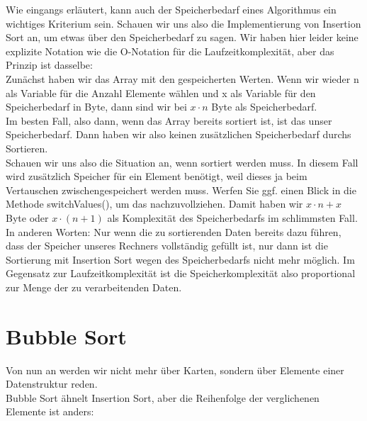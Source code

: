 Wie eingangs erläutert, kann auch der Speicherbedarf eines Algorithmus ein wichtiges Kriterium sein. Schauen wir uns also die Implementierung von Insertion Sort an, um etwas über den Speicherbedarf zu sagen. Wir haben hier leider keine explizite Notation wie die O-Notation für die Laufzeitkomplexität, aber das Prinzip ist dasselbe:\\

Zunächst haben wir das Array mit den gespeicherten Werten. Wenn wir wieder n als Variable für die Anzahl Elemente wählen und x als Variable für den Speicherbedarf in Byte, dann sind wir bei \(x \cdot n\) Byte als Speicherbedarf.\\

Im besten Fall, also dann, wenn das Array bereits sortiert ist, ist das unser Speicherbedarf. Dann haben wir also keinen zusätzlichen Speicherbedarf durchs Sortieren.\\

Schauen wir uns also die Situation an, wenn sortiert werden muss. In diesem Fall wird zusätzlich Speicher für ein Element benötigt, weil dieses ja beim Vertauschen zwischengespeichert werden muss. Werfen Sie ggf. einen Blick in die Methode switchValues(), um das nachzuvollziehen. Damit haben wir \(x \cdot n + x\) Byte oder \(x \cdot (n + 1)\) als Komplexität des Speicherbedarfs im schlimmsten Fall.\\

In anderen Worten: Nur wenn die zu sortierenden Daten bereits dazu führen, dass der Speicher unseres Rechners vollständig gefüllt ist, nur dann ist die Sortierung mit Insertion Sort wegen des Speicherbedarfs nicht mehr möglich. Im Gegensatz zur Laufzeitkomplexität ist die Speicherkomplexität also proportional zur Menge der zu verarbeitenden Daten.

\section{Bubble Sort}

Von nun an werden wir nicht mehr über Karten, sondern über Elemente einer Datenstruktur reden.\\

Bubble Sort ähnelt Insertion Sort, aber die Reihenfolge der verglichenen Elemente ist anders:

